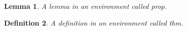 \documentclass{article}
\newtheorem{prop}{Lemma}
\newtheorem{thm}[prop]{Definition}
\begin{document}
\begin{prop}
A lemma in an environment called prop.
\end{prop}
\begin{thm}
A definition in an environment called thm.
\end{thm}
\end{document}
